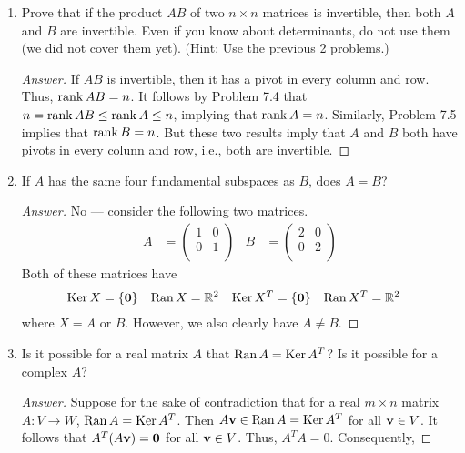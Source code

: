 \documentclass[../psets.tex]{subfiles}
\begin{document}
\begin{enumerate}[label={\textbf{7.\arabic*.}}]
    \item Prove that if the product $AB$ of two $n\times n$ matrices is invertible, then both $A$ and $B$ are invertible. Even if you know about determinants, do not use them (we did not cover them yet). (Hint: Use the previous 2 problems.)
    \begin{proof}[Answer]
        If $AB$ is invertible, then it has a pivot in every column and row. Thus, $\operatorname{rank} AB=n$. It follows by Problem 7.4 that $n=\operatorname{rank} AB\leq\operatorname{rank} A\leq n$, implying that $\operatorname{rank} A=n$. Similarly, Problem 7.5 implies that $\operatorname{rank} B=n$. But these two results imply that $A$ and $B$ both have pivots in every colunn and row, i.e., both are invertible.
    \end{proof}
    \setcounter{enumi}{8}
    \item If $A$ has the same four fundamental subspaces as $B$, does $A=B$?
    \begin{proof}[Answer]
        No --- consider the following two matrices.
        \begin{align*}
            A &=
            \begin{pmatrix}
                1 & 0\\
                0 & 1\\
            \end{pmatrix}&
            B &=
            \begin{pmatrix}
                2 & 0\\
                0 & 2\\
            \end{pmatrix}
        \end{align*}
        Both of these matrices have
        \begin{align*}
            \operatorname{Ker} X &= \{\bm{0}\}&
            \operatorname{Ran} X &= \mathbb{R}^2&
            \operatorname{Ker} X^T &= \{\bm{0}\}&
            \operatorname{Ran} X^T &= \mathbb{R}^2
        \end{align*}
        where $X=A\text{ or }B$. However, we also clearly have $A\neq B$.
    \end{proof}
    \setcounter{enumi}{13}
    \item Is it possible for a real matrix $A$ that $\operatorname{Ran} A=\operatorname{Ker} A^T$? Is it possible for a complex $A$?
    \begin{proof}[Answer]
        Suppose for the sake of contradiction that for a real $m\times n$ matrix $A:V\to W$, $\operatorname{Ran} A=\operatorname{Ker} A^T$. Then $A\mathbf{v}\in\operatorname{Ran} A=\operatorname{Ker} A^T$ for all $\mathbf{v}\in V$. It follows that $A^T(A\mathbf{v})=\bm{0}$ for all $\mathbf{v}\in V$. Thus, $A^TA=0$. Consequently,

\end{proof}
\end{enumerate}
\end{document}
